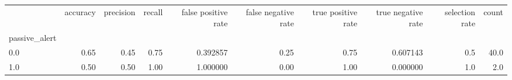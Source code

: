 \begin{tabular}{lrrrrrrrrr}
\toprule
{} &  accuracy &  precision &  recall &  false positive rate &  false negative rate &  true positive rate &  true negative rate &  selection rate &  count \\
passive\_alert &           &            &         &                      &                      &                     &                     &                 &        \\
\midrule
0.0           &      0.65 &       0.45 &    0.75 &             0.392857 &                 0.25 &                0.75 &            0.607143 &             0.5 &   40.0 \\
1.0           &      0.50 &       0.50 &    1.00 &             1.000000 &                 0.00 &                1.00 &            0.000000 &             1.0 &    2.0 \\
\bottomrule
\end{tabular}
